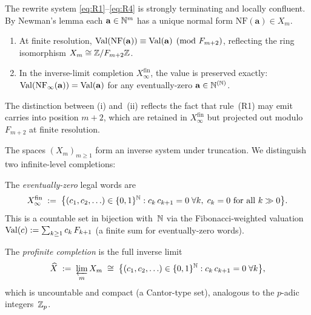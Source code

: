 \begin{proposition}
\label{prop:fold-confluence}
The rewrite system \eqref{eq:R1}--\eqref{eq:R4} is strongly
terminating and locally confluent.  By Newman's lemma each
$\mathbf{a} \in \mathbb{N}^{m}$ has a unique normal form
$\mathrm{NF}(\mathbf{a}) \in X_{m}$.
\begin{enumerate}[label=(\roman*)]
\item At finite resolution,
  $\operatorname{Val}(\mathrm{NF}(\mathbf{a})) \equiv \operatorname{Val}(\mathbf{a})
    \pmod{F_{m+2}}$,
  reflecting the ring isomorphism $X_{m} \cong \mathbb{Z}/F_{m+2}\mathbb{Z}$.
\item In the inverse-limit completion
  $X_{\infty}^{\mathrm{fin}}$, the value is preserved exactly:
  $\operatorname{Val}(\mathrm{NF}_{\infty}(\mathbf{a})) = \operatorname{Val}(\mathbf{a})$
  for any eventually-zero $\mathbf{a} \in \mathbb{N}^{(\mathbb{N})}$.
\end{enumerate}
The distinction between (i) and~(ii) reflects the fact that
rule~(R1) may emit carries into position $m+2$, which are
retained in $X_{\infty}^{\mathrm{fin}}$ but projected out modulo
$F_{m+2}$ at finite resolution.
\end{proposition}

The spaces $(X_{m})_{m \ge 1}$ form an inverse system under
truncation.  We distinguish two infinite-level completions:

\begin{definition}
\label{def:completions}
The \emph{eventually-zero} legal words are
\begin{equation}\label{eq:X-fin}
  X_{\infty}^{\mathrm{fin}}
    \;:=\; \bigl\{(c_{1},c_{2},\ldots) \in \{0,1\}^{\mathbb{N}}
      : c_{k}\, c_{k+1} = 0\;\forall k,\;
      c_{k} = 0 \text{ for all } k \gg 0\bigr\}.
\end{equation}
This is a countable set in bijection with~$\mathbb{N}$ via the
Fibonacci-weighted valuation
$\operatorname{Val}(c) := \sum_{k \ge 1} c_{k}\, F_{k+1}$
(a finite sum for eventually-zero words).

The \emph{profinite completion} is the full inverse limit
\begin{equation}\label{eq:X-infty}
  \widehat{X}
    \;:=\; \varprojlim_{m} X_{m}
    \;\cong\; \bigl\{(c_{1},c_{2},\ldots) \in \{0,1\}^{\mathbb{N}}
      : c_{k}\, c_{k+1} = 0 \;\forall k\bigr\},
\end{equation}
which is uncountable and compact (a Cantor-type set),
analogous to the $p$-adic integers~$\mathbb{Z}_{p}$.
\end{definition}

